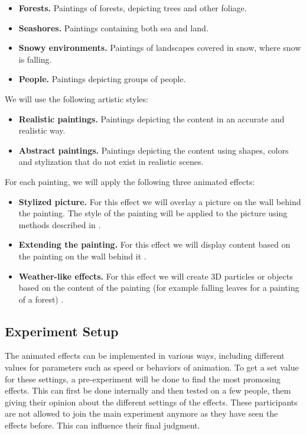 \documentclass[a4paper]{article}
\begin{document}
\begin{itemize}
\item \textbf{Forests.} Paintings of forests, depicting trees and other foliage.
\item \textbf{Seashores.} Paintings containing both sea and land.
\item \textbf{Snowy environments.} Paintings of landscapes covered in snow, where snow is falling.
\item \textbf{People.} Paintings depicting groups of people.
\end{itemize}

We will use the following artistic styles:

\begin{itemize}
\item \textbf{Realistic paintings.} Paintings depicting the content in an accurate and realistic way.
\item \textbf{Abstract paintings.} Paintings depicting the content using shapes, colors and stylization that do not exist in realistic scenes.
\end{itemize}

For each painting, we will apply the following three animated effects:

\begin{itemize}
\item \textbf{Stylized picture.} For this effect we will overlay a picture on the wall behind the painting. The style of the painting will be applied to the picture using methods described in \cite{gatys}.
\item \textbf{Extending the painting.} For this effect we will display content based on the painting on the wall behind it \cite{inpainting}.
\item \textbf{Weather-like effects.} For this effect we will create 3D particles or objects based on the content of the painting (for example falling leaves for a painting of a forest) \cite{illumiroom}.
\end{itemize}

\subsection{Experiment Setup}

The animated effects can be implemented in various ways, including different values for parameters such as speed or behaviors of animation. To get a set value for these settings, a pre-experiment will be done to find the most promosing effects. This can first be done internally and then tested on a few people, them giving their opinion about the different settings of the effects. These participants are not allowed to join the main experiment anymore as they have seen the effects before. This can influence their final judgment.
\end{document}
